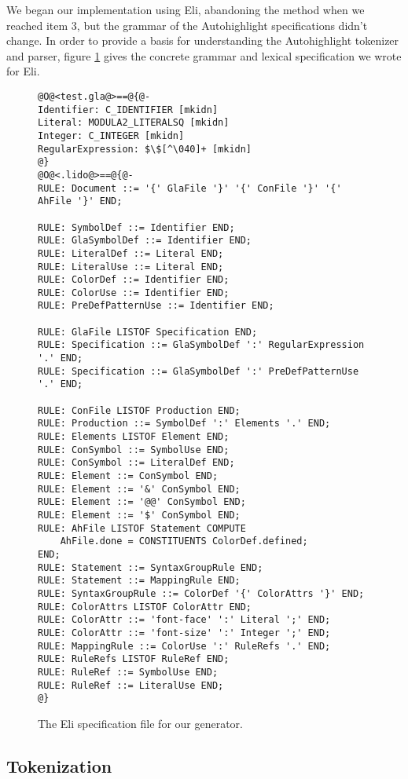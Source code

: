 \documentclass[]{article}
\begin{document}
  We began our implementation using Eli, abandoning the method when we
  reached item 3, but the grammar of the Autohighlight specifications
  didn't change. In order to provide a basis for understanding the
  Autohighlight tokenizer and parser, figure \ref{fig:eli} gives the concrete
  grammar and lexical specification we wrote for Eli.

  \begin{figure}
    \begin{lstlisting}
@O@<test.gla@>==@{@-
Identifier: C_IDENTIFIER [mkidn]
Literal: MODULA2_LITERALSQ [mkidn]
Integer: C_INTEGER [mkidn]
RegularExpression: $\$[^\040]+ [mkidn]
@}
@O@<.lido@>==@{@-
RULE: Document ::= '{' GlaFile '}' '{' ConFile '}' '{' AhFile '}' END;

RULE: SymbolDef ::= Identifier END;
RULE: GlaSymbolDef ::= Identifier END;
RULE: LiteralDef ::= Literal END;
RULE: LiteralUse ::= Literal END;
RULE: ColorDef ::= Identifier END;
RULE: ColorUse ::= Identifier END;
RULE: PreDefPatternUse ::= Identifier END;

RULE: GlaFile LISTOF Specification END;
RULE: Specification ::= GlaSymbolDef ':' RegularExpression '.' END;
RULE: Specification ::= GlaSymbolDef ':' PreDefPatternUse '.' END;

RULE: ConFile LISTOF Production END;
RULE: Production ::= SymbolDef ':' Elements '.' END;
RULE: Elements LISTOF Element END;
RULE: ConSymbol ::= SymbolUse END;
RULE: ConSymbol ::= LiteralDef END;
RULE: Element ::= ConSymbol END;
RULE: Element ::= '&' ConSymbol END;
RULE: Element ::= '@@' ConSymbol END;
RULE: Element ::= '$' ConSymbol END;
RULE: AhFile LISTOF Statement COMPUTE
	AhFile.done = CONSTITUENTS ColorDef.defined;
END;
RULE: Statement ::= SyntaxGroupRule END;
RULE: Statement ::= MappingRule END;
RULE: SyntaxGroupRule ::= ColorDef '{' ColorAttrs '}' END;
RULE: ColorAttrs LISTOF ColorAttr END;
RULE: ColorAttr ::= 'font-face' ':' Literal ';' END;
RULE: ColorAttr ::= 'font-size' ':' Integer ';' END;
RULE: MappingRule ::= ColorUse ':' RuleRefs '.' END;
RULE: RuleRefs LISTOF RuleRef END;
RULE: RuleRef ::= SymbolUse END;
RULE: RuleRef ::= LiteralUse END;
@}
    \end{lstlisting} %
    \label{fig:eli}
    \caption{The Eli specification file for our generator.}
  \end{figure}

  \subsection{Tokenization}
\end{document}
